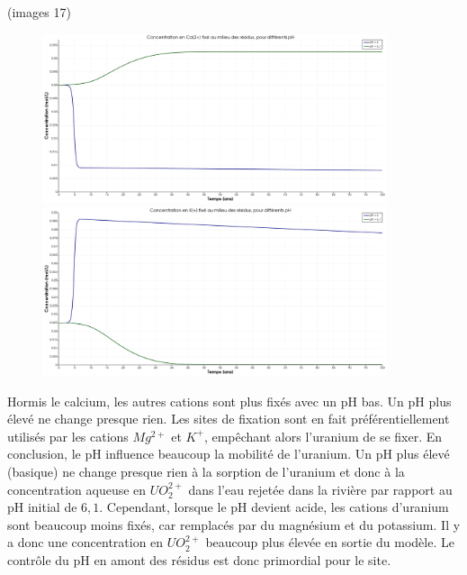 \documentclass{article}
\begin{document}
(images 17)
\begin{figure}[H]
    \centering
    \begin{minipage}{0.5\textwidth}
        \centering
        \includegraphics[width=0.9\textwidth]{III_B_2_15.png} 
        \caption{}
        \label{fig:Ca_residus_comparaison}
    \end{minipage}\hfill
    \begin{minipage}{0.5\textwidth}
        \centering
        \includegraphics[width=0.9\textwidth]{III_B_2_16.png} 
        \caption{}
        \label{fig:K_residus_comparaison}
    \end{minipage}
\end{figure}


Hormis le calcium, les autres cations sont plus fixés avec un pH bas. Un pH plus élevé ne change presque rien. Les sites de fixation sont en fait préférentiellement utilisés par les cations $Mg^{2+}$ et $K^{+}$, empêchant alors l’uranium de se fixer.
En conclusion, le pH influence beaucoup la mobilité de l’uranium. Un pH plus élevé (basique) ne change presque rien à la sorption de l’uranium et donc à la concentration aqueuse en $UO_2^{2+}$ dans l’eau rejetée dans la rivière par rapport au pH initial de $6,1$. Cependant, lorsque le pH devient acide, les cations d’uranium sont beaucoup moins fixés, car remplacés par du magnésium et du potassium. Il y a donc une concentration en $UO_2^{2+}$ beaucoup plus élevée en sortie du modèle. Le contrôle du pH en amont des résidus est donc primordial pour le site.
\end{document}
